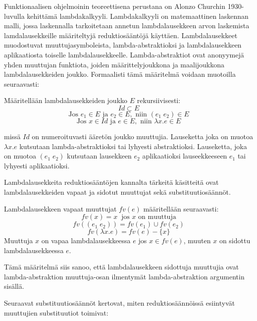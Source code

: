 \par
Funktionaalisen ohjelmoinin teoreettisena perustana on Alonzo Churchin 1930-luvulla kehittämä lambdakalkyyli. Lambdakalkyyli on matemaattinen laskennan malli, jossa laskennalla tarkoitetaan annetun lambdalausekkeen arvon laskemista lamdalausekkeille määriteltyjä reduktiosääntöjä käyttäen. Lambdalausekkeet muodostuvat muuttujasymboleista, lambda-abstraktioksi ja lambdalausekkeen aplikaatiosta toiselle lambdalausekkeelle. Lambda-abstraktiot ovat anonyymejä yhden muuttujan funktiota, joiden määrittelyjoukkona ja maalijoukkona lambdalausekkeiden joukko. Formaalisti tämä määritelmä voidaan muotoilla seuraavasti:

\begin{maar}[Lambdalausekkeet]
Määritellään lambdalausekkeiden joukko $E$ rekursiivisesti: 
\[ Id \subset E \]
\[ \text{Jos } e_{1} \in E \text{ ja } e_{2} \in E, \text{ niin }  (e_{1} \; e_{2}) \in E \]
\[ \text{Jos } x \in Id \text{ ja } e \in E, \text{ niin } \lambda x.e \in E \]

missä $Id$ on numeroituvasti ääretön joukko muuttujia. Lauseketta joka on muotoa $\lambda x.e$ kutsutaan lambda-abstraktioksi tai lyhyesti abstraktioksi. Lauseketta, joka on muotoa $(e_{1} \; e_{2})$ kutsutaan lausekkeen $e_{2}$ aplikaatioksi lauseekkeeseen $e_{1}$ tai lyhyesti aplikaatioksi.
\end{maar}
\par
Lambdalausekkeita reduktiosääntöjen kannalta tärkeitä käsitteitä ovat lambdalausekkeiden vapaat ja sidotut muuttujat sekä substituutiosäännöt.

\begin{maar}
Lambdalausekkeen vapaat muuttujat $fv(e)$ määritellään seuraavasti: 
\[fv(x) = x\ \text{ jos } x \text{ on muuttuja} \]
\[fv((e_{1} \; e_{2})) = fv(e_{1}) \cup fv(e_{2}) \]
\[ fv(\lambda x.e) = fv(e) - \{x\} \]
Muuttuja $x$ on vapaa lambdalausekkeessa $e$ jos $x \in fv(e)$, muuten $x$ on sidottu lambdalausekkeessa $e$.
\end{maar} 
Tämä määritelmä siis sanoo, että lambdalausekkeen sidottuja muuttujia ovat lambda-abstraktion muuttuja-osan ilmentymät lambda-abstraktion argumentin sisällä.   
\par
Seuraavat substituutiosäännöt kertovat, miten reduktiosäännöissä esiintyvät muuttujien substituutiot toimivat:

